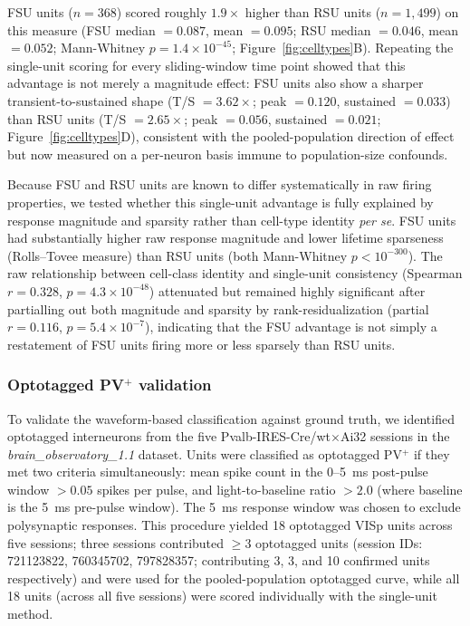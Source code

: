 \documentclass[11pt,onecolumn]{article}
\begin{document}
FSU units ($n = 368$) scored roughly $1.9\times$ higher than RSU units
($n = 1{,}499$) on this measure (FSU median $= 0.087$, mean $= 0.095$; RSU
median $= 0.046$, mean $= 0.052$; Mann-Whitney $p = 1.4\times10^{-45}$;
Figure~\ref{fig:celltypes}B).  Repeating the single-unit scoring for every
sliding-window time point showed that this advantage is not merely a
magnitude effect: FSU units also show a sharper transient-to-sustained
shape (T/S $= 3.62\times$; peak $= 0.120$, sustained $= 0.033$) than RSU
units (T/S $= 2.65\times$; peak $= 0.056$, sustained $= 0.021$;
Figure~\ref{fig:celltypes}D), consistent with the pooled-population
direction of effect but now measured on a per-neuron basis immune to
population-size confounds.

Because FSU and RSU units are known to differ systematically in raw
firing properties, we tested whether this single-unit advantage is fully
explained by response magnitude and sparsity rather than cell-type
identity \textit{per se}.  FSU units had substantially higher raw response
magnitude and lower lifetime sparseness (Rolls--Tovee measure) than RSU
units (both Mann-Whitney $p < 10^{-300}$).  The raw relationship between
cell-class identity and single-unit consistency (Spearman $r = 0.328$,
$p = 4.3\times10^{-48}$) attenuated but remained highly significant after
partialling out both magnitude and sparsity by rank-residualization
(partial $r = 0.116$, $p = 5.4\times10^{-7}$), indicating that the FSU
advantage is not simply a restatement of FSU units firing more or less
sparsely than RSU units.

\subsubsection{\texorpdfstring{Optotagged PV$^+$ validation}{Optotagged PV+ validation}}

To validate the waveform-based classification against ground truth, we
identified optotagged interneurons from the five
Pvalb-IRES-Cre/wt$\times$Ai32 sessions in the
\textit{brain\_observatory\_1.1} dataset.  Units were classified as
optotagged PV$^+$ if they met two criteria simultaneously: mean spike
count in the 0--5~ms post-pulse window $> 0.05$ spikes per pulse, and
light-to-baseline ratio $> 2.0$ (where baseline is the 5~ms pre-pulse
window).  The 5~ms response window was chosen to exclude polysynaptic
responses.  This procedure yielded 18 optotagged VISp units across five
sessions; three sessions contributed $\geq 3$ optotagged units (session
IDs: 721123822, 760345702, 797828357; contributing 3, 3, and 10 confirmed
units respectively) and were used for the pooled-population optotagged
curve, while all 18 units (across all five sessions) were scored
individually with the single-unit method.
\end{document}
